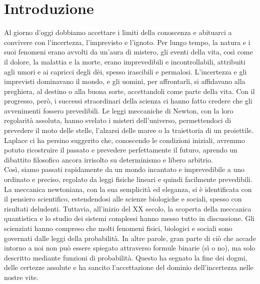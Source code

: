 \chapter{Introduzione}
\label{cap:introduzione}




Al giorno d'oggi dobbiamo accettare i limiti della conoscenza e abituarci a convivere con l'incertezza, l'imprevisto e l'ignoto. Per lungo tempo, la natura e i suoi fenomeni erano avvolti da un'aura di mistero, gli eventi della vita, così come il dolore, la malattia e la morte, erano imprevedibili e incontrollabili, attribuiti agli umori e ai capricci degli dèi, spesso irascibili e permalosi. L'incertezza e gli imprevisti dominavano il mondo, e gli uomini, per affrontarli, si affidavano alla preghiera, al destino o alla buona sorte, accettandoli come parte della vita. Con il progresso, però, i successi straordinari della scienza ci hanno fatto credere che gli avvenimenti fossero prevedibili. Le leggi meccaniche di Newton, con la loro regolarità assoluta, hanno svelato i misteri dell'universo, permettendoci di prevedere il moto delle stelle, l'alzarsi delle maree o la traiettoria di un proiettile. Laplace ci ha persino suggerito che, conoscendo le condizioni iniziali, avremmo potuto ricostruire il passato e prevedere perfettamente il futuro, aprendo un dibattito filosofico ancora irrisolto su determinismo e libero arbitrio.\\

Così, siamo passati rapidamente da un mondo incantato e imprevedibile a uno ordinato e preciso, regolato da leggi fisiche lineari e quindi facilmente prevedibili. La meccanica newtoniana, con la sua semplicità ed eleganza, si è identificata con il pensiero scientifico, estendendosi alle scienze biologiche e sociali, spesso con risultati deludenti. Tuttavia, all'inizio del XX secolo, la scoperta della meccanica quantistica e lo studio dei sistemi complessi hanno messo tutto in discussione. Gli scienziati hanno compreso che molti fenomeni fisici, biologici e sociali sono governati dalle leggi della probabilità. In altre parole, gran parte di ciò che accade intorno a noi non può essere spiegato attraverso formule binarie (sì o no), ma solo descritto mediante funzioni di probabilità. Questo ha segnato la fine dei dogmi, delle certezze assolute e ha sancito l'accettazione del dominio dell'incertezza nelle nostre vite.\\

